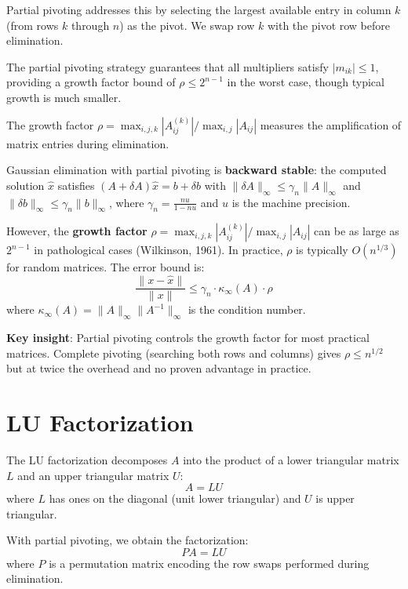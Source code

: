 Partial pivoting  addresses this by selecting the largest available entry in column $k$ (from rows $k$ through $n$) as the pivot. We swap row $k$ with the pivot row before elimination.

The partial pivoting strategy guarantees that all multipliers satisfy $|m_{ik}| \leq 1$, providing a growth factor bound of $\rho \leq 2^{n-1}$ in the worst case, though typical growth is much smaller.

\begin{definition}
The growth factor $\rho = \max_{i,j,k} |A_{ij}^{(k)}| / \max_{i,j} |A_{ij}|$ measures the amplification of matrix entries during elimination.
\end{definition}

Gaussian elimination with partial pivoting is \textbf{backward stable}: the computed solution $\hat{x}$ satisfies $(A + \delta A)\hat{x} = b + \delta b$ with $\|\delta A\|_\infty \leq \gamma_n \|A\|_\infty$ and $\|\delta b\|_\infty \leq \gamma_n \|b\|_\infty$, where $\gamma_n = \frac{nu}{1 - nu}$ and $u$ is the machine precision.

However, the \textbf{growth factor} $\rho = \max_{i,j,k} |A_{ij}^{(k)}| / \max_{i,j} |A_{ij}|$ can be as large as $2^{n-1}$ in pathological cases (Wilkinson, 1961). In practice, $\rho$ is typically $O(n^{1/3})$ for random matrices. The error bound is:
\[
\frac{\|x - \hat{x}\|}{\|x\|} \leq \gamma_n \cdot \kappa_\infty(A) \cdot \rho
\]
where $\kappa_\infty(A) = \|A\|_\infty \|A^{-1}\|_\infty$ is the condition number.

\textbf{Key insight}: Partial pivoting controls the growth factor for most practical matrices. Complete pivoting (searching both rows and columns) gives $\rho \leq n^{1/2}$ but at twice the overhead and no proven advantage in practice.

\section{LU Factorization}

The LU factorization  decomposes $A$ into the product of a lower triangular matrix $L$ and an upper triangular matrix $U$:
\[
A = LU
\]
where $L$ has ones on the diagonal (unit lower triangular) and $U$ is upper triangular.

With partial pivoting, we obtain the factorization:
\[
PA = LU
\]
where $P$ is a permutation matrix encoding the row swaps performed during elimination.


